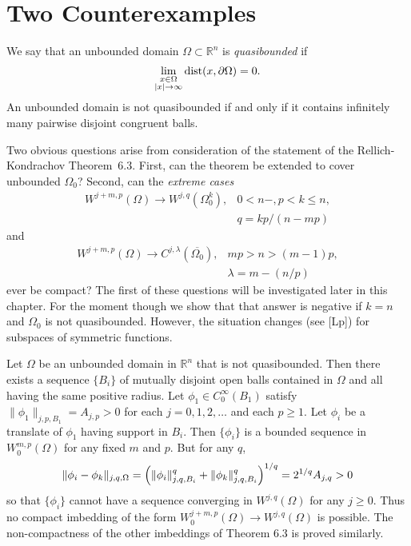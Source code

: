 \section{Two Counterexamples}\label{sec:Two-Counterexamples}

\begin{para}
  We say that an unbounded domain $\Omega\subset\mathbb{R}^n$ is
  \emph{quasibounded} if
  \[ \lim_{\substack{x\in\Omega\\ |x|\to\infty}} \operatorname{dist}(x,\partial\Omega) = 0. \]
  An unbounded domain is not quasibounded if and only if it contains infinitely
  many pairwise disjoint congruent balls.
\end{para}

\begin{para}
  Two obvious questions arise from consideration of the statement of the Rellich-Kondrachov
  Theorem~6.3. First, can the theorem be extended to cover unbounded $\Omega_0$?
  Second, can the \emph{extreme cases}
  \begin{align*}
    W^{j+m,p}(\Omega) \to W^{j,q}(\Omega_0^k),
    & 0<n-, p<k\leq n, \\
    & q = kp/(n-mp)
  \end{align*}
  and
  \begin{align*}
    W^{j+m,p}(\Omega) \to C^{j,\lambda}(\overline{\Omega_0}),
    & mp>n>(m-1)p, \\
    & \lambda = m-(n/p)
  \end{align*}
  ever be compact? The first of these questions will be investigated later in this chapter.
  For the moment though we show that that answer is negative if $k=n$ and $\Omega_0$
  is not quasibounded. However, the situation changes (see [Lp]) for subspaces of symmetric
  functions.
\end{para}

\begin{example}
  Let $\Omega$ be an unbounded domain in $\mathbb{R}^n$ that is not quasibounded.
  Then there exists a sequence $\{B_i\}$ of mutually disjoint open balls contained
  in $\Omega$ and all having the same positive radius.
  Let $\phi_1\in C_0^\infty(B_1)$ satisfy $\|\phi_1\|_{j,p,B_1}=A_{j,p}>0$
  for each $j=0,1,2,\ldots$ and each $p\geq 1$.
  Let $\phi_i$ be a translate of $\phi_1$ having support in $B_i$.
  Then $\{\phi_i\}$ is a bounded sequence in $W^{m,p}_0(\Omega)$
  for any fixed $m$ and $p$. But for any $q$,
  \[\|\phi_i-\phi_k\|_{j,q,\Omega}
    = \Bigl(\|\phi_i\|_{j,q,B_i}^q + \|\phi_k\|_{j,q,B_i}^q\Bigr)^{1/q}
    = 2^{1/q} A_{j,q} >0\]
  so that $\{\phi_i\}$ cannot have a sequence converging in $W^{j,q}(\Omega)$
  for any $j\geq 0$. Thus no compact imbedding of the form
  $W^{j+m,p}_0(\Omega)\to W^{j,q}(\Omega)$ is possible.
  The non-compactness of the other imbeddings of Theorem 6.3 is proved similarly.
\end{example}

